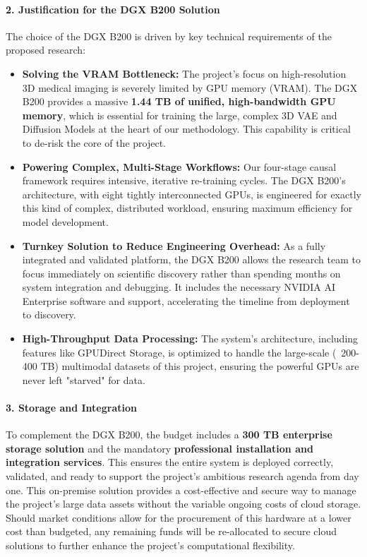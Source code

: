 \paragraph{2. Justification for the DGX B200 Solution}
The choice of the DGX B200 is driven by key technical requirements of the proposed research:
\begin{itemize}
    \item \textbf{Solving the VRAM Bottleneck:} The project's focus on high-resolution 3D medical imaging is severely limited by GPU memory (VRAM). The DGX B200 provides a massive \textbf{1.44 TB of unified, high-bandwidth GPU memory}, which is essential for training the large, complex 3D VAE and Diffusion Models at the heart of our methodology. This capability is critical to de-risk the core of the project.
    \item \textbf{Powering Complex, Multi-Stage Workflows:} Our four-stage causal framework requires intensive, iterative re-training cycles. The DGX B200's architecture, with eight tightly interconnected GPUs, is engineered for exactly this kind of complex, distributed workload, ensuring maximum efficiency for model development.
    \item \textbf{Turnkey Solution to Reduce Engineering Overhead:} As a fully integrated and validated platform, the DGX B200 allows the research team to focus immediately on scientific discovery rather than spending months on system integration and debugging. It includes the necessary NVIDIA AI Enterprise software and support, accelerating the timeline from deployment to discovery.
    \item \textbf{High-Throughput Data Processing:} The system's architecture, including features like GPUDirect Storage, is optimized to handle the large-scale (~200-400 TB) multimodal datasets of this project, ensuring the powerful GPUs are never left "starved" for data.
\end{itemize}

\paragraph{3. Storage and Integration}
To complement the DGX B200, the budget includes a \textbf{300 TB enterprise storage solution} and the mandatory \textbf{professional installation and integration services}. This ensures the entire system is deployed correctly, validated, and ready to support the project's ambitious research agenda from day one. This on-premise solution provides a cost-effective and secure way to manage the project's large data assets without the variable ongoing costs of cloud storage. Should market conditions allow for the procurement of this hardware at a lower cost than budgeted, any remaining funds will be re-allocated to secure cloud solutions to further enhance the project's computational flexibility.

